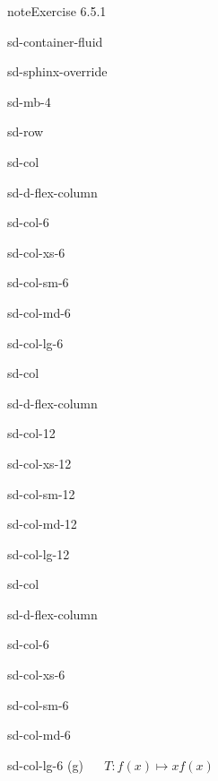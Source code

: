 \documentclass[letterpaper,10pt,english]{jupyterBook}
\begin{document}
\begin{sphinxadmonition}{note}{Exercise 6.5.1}
\begin{sphinxuseclass}{sd-container-fluid}
\begin{sphinxuseclass}{sd-sphinx-override}
\begin{sphinxuseclass}{sd-mb-4}
\begin{sphinxuseclass}{sd-row}
\begin{sphinxuseclass}{sd-col}
\begin{sphinxuseclass}{sd-d-flex-column}
\begin{sphinxuseclass}{sd-col-6}
\begin{sphinxuseclass}{sd-col-xs-6}
\begin{sphinxuseclass}{sd-col-sm-6}
\begin{sphinxuseclass}{sd-col-md-6}
\begin{sphinxuseclass}{sd-col-lg-6}
\end{sphinxuseclass}
\end{sphinxuseclass}
\end{sphinxuseclass}
\end{sphinxuseclass}
\end{sphinxuseclass}
\end{sphinxuseclass}
\end{sphinxuseclass}
\begin{sphinxuseclass}{sd-col}
\begin{sphinxuseclass}{sd-d-flex-column}
\begin{sphinxuseclass}{sd-col-12}
\begin{sphinxuseclass}{sd-col-xs-12}
\begin{sphinxuseclass}{sd-col-sm-12}
\begin{sphinxuseclass}{sd-col-md-12}
\begin{sphinxuseclass}{sd-col-lg-12}
\sphinxAtStartPar
 

\end{sphinxuseclass}
\end{sphinxuseclass}
\end{sphinxuseclass}
\end{sphinxuseclass}
\end{sphinxuseclass}
\end{sphinxuseclass}
\end{sphinxuseclass}
\begin{sphinxuseclass}{sd-col}
\begin{sphinxuseclass}{sd-d-flex-column}
\begin{sphinxuseclass}{sd-col-6}
\begin{sphinxuseclass}{sd-col-xs-6}
\begin{sphinxuseclass}{sd-col-sm-6}
\begin{sphinxuseclass}{sd-col-md-6}
\begin{sphinxuseclass}{sd-col-lg-6}
\sphinxAtStartPar
(g)   \(T: f(x) \mapsto xf(x)\)


\end{sphinxuseclass}
\end{sphinxuseclass}
\end{sphinxuseclass}
\end{sphinxuseclass}
\end{sphinxuseclass}
\end{sphinxuseclass}
\end{sphinxuseclass}
\end{sphinxuseclass}
\end{sphinxuseclass}
\end{sphinxuseclass}
\end{sphinxuseclass}
\end{sphinxadmonition}
\end{document}
